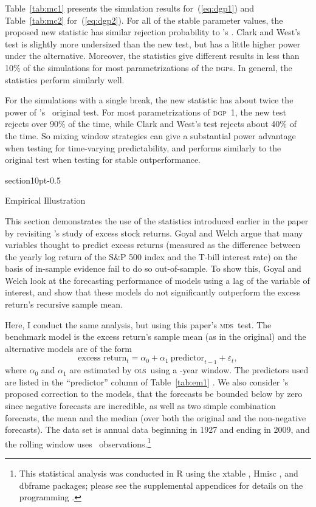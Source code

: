 \documentclass[10pt,fleqn,draft]{article}
\makeatletter
\newcommand\citepos[2][]{\citeauthor{#2}'s \citeyearpar[#1]{#2}}
\newcommand\poscw{\citeauthor{ClW:06}'s \citeyearpar{ClW:06,ClW:07}}
\renewcommand\section{\@startsection%
{section}{1}{0pt}{-\baselineskip}{0.5\baselineskip}%
{\normalfont\normalsize\bfseries\large\raggedright}}
\theoremstyle{definition}
\newcommand{\dgp}{\textsc{dgp}}
\newcommand{\mds}{\textsc{mds}}
\newcommand{\ols}{\textsc{ols}}
\makeatother
\begin{document}
Table~\ref{tab:mc1} presents the simulation results
for~(\ref{eq:dgp1}) and Table~\ref{tab:mc2} for~(\ref{eq:dgp2}).  For
all of the stable parameter values, the proposed new statistic has
similar rejection probability to \citepos{ClW:07}.  Clark and West's
test is slightly more undersized than the new test, but has a little
higher power under the alternative.  Moreover, the statistics give
different results in less than 10\% of the simulations for most
parametrizations of the \dgp s.  In general, the statistics perform
similarly well.

For the simulations with a single break, the new statistic has about
twice the power of \poscw\ original test.  For most parametrizations
of \dgp\ 1, the new test rejects over 90\% of the time, while Clark
and West's test rejects about 40\% of the time.  So mixing window
strategies can give a substantial power advantage when testing for
time-varying predictability, and performs similarly to the original
test when testing for stable outperformance.

\section{Empirical Illustration}\label{sec:3}

This section demonstrates the use of the statistics introduced earlier
in the paper by revisiting \citepos{GoW:08} study of excess stock
returns.  Goyal and Welch argue that many variables thought to predict
excess returns (measured as the difference between the yearly log
return of the S\&P 500 index and the T-bill interest rate) on the
basis of in-sample evidence fail to do so out-of-sample.  To show
this, Goyal and Welch look at the forecasting performance of models
using a lag of the variable of interest, and show that these models do
not significantly outperform the excess return's recursive sample mean.

Here, I conduct the same analysis, but using this paper's \mds\ test.
The benchmark model is the excess return's sample mean (as in the
original) and the alternative models are of the form
\[\text{excess return}_{t} = \alpha_{0} + \alpha_{1}\ 
\text{predictor}_{t-1} + \varepsilon_{t},\] where $\alpha_{0}$ and
$\alpha_{1}$ are estimated by \ols\ using a \windowlength-year window.
The predictors used are listed in the ``predictor'' column of
Table~\ref{tab:em1} \citep[see][for a detailed description of the
variables]{GoW:08}.  We also consider \citepos{CaT:08} proposed
correction to the models, that the forecasts be bounded below by zero
since negative forecasts are incredible, as well as two simple
combination forecasts, the mean and the median (over both the original
and the non-negative forecasts).  The data set is annual data
beginning in 1927 and ending in 2009, and the rolling window uses
\windowlength\ observations.\footnote{This statistical analysis was
  conducted in R \citep{R} using the xtable \citep[version]{Dah:09},
  Hmisc \citep[version]{Har:10}, and dbframe \citep[version
  0.2.1]{Cal:10b} packages; please see the supplemental appendices for
  details on the programming \citep{Cal:11f,Cal:11g,Cal:11h}.}
\end{document}
